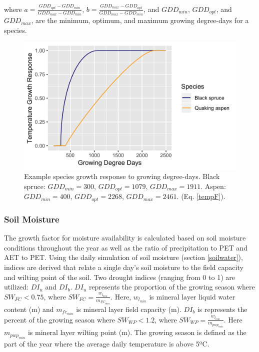 \documentclass[a4paper, 12pt] {report}
\begin{document}
where $a = \frac{GDD_{opt} - GDD_{min}}{GDD_{max} - GDD_{min}}$, $b = \frac{GDD_{max} - GDD_{opt}}{GDD_{max} - GDD_{min}}$, and $GDD_{min}$, $GDD_{opt}$, and $GDD_{max}$, are the minimum, optimum, and maximum growing degree-days for a species.

\begin{figure}
  \includegraphics[width=0.9\linewidth]{Figures/tempResp.png}
  \caption{Example species growth response to growing degree-days. Black spruce: $GDD_{min} = 300$, $GDD_{opt} = 1079$, $GDD_{max} = 1911$. Aspen: $GDD_{min} = 400$, $GDD_{opt} = 2268$, $GDD_{max} = 2461$.  (Eq. \ref{tempF}).}
  \label{fig:temp}
\end{figure}

\subsubsection{Soil Moisture}
The growth factor for moisture availability is calculated based on soil moisture conditions throughout the year as well as the ratio of precipitation to PET and AET to PET. Using the daily simulation of soil moisture (section \ref{soilwater}), indices are derived that relate a single day's soil moisture to the field capacity and wilting point of the soil. Two drought indices (ranging from 0 to 1) are utilized: $DI_u$ and $DI_b$. $DI_u$ represents the proportion of the growing season where $SW_{FC} < 0.75$, where $SW_{FC} = \frac{w_{l_{min}}}{m_{FC_{min}}}$. Here, $w_{l_{min}}$ is mineral layer liquid water content (m) and $m_{fc_{min}}$ is mineral layer field capacity (m). $DI_b$ is represents the percent of the growing season where $SW_{WP} < 1.2$, where $SW_{WP} = \frac{w_{l_{min}}}{m_{pwp_{min}}}$. Here $m_{pwp_{min}}$ is mineral layer wilting point (m). The growing season is defined as the part of the year where the average daily temperature is above 5ºC.
\end{document}
